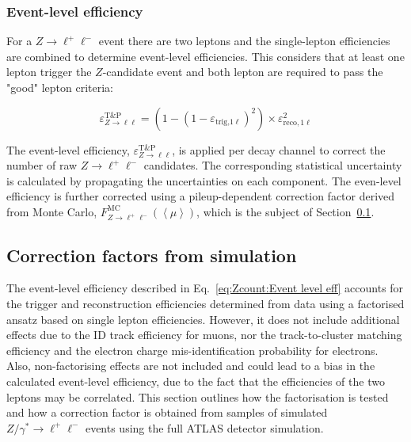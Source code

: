 \subsubsection{Event-level efficiency}

For a $Z\rightarrow\ell^+\ell^-$ event there are two leptons and the single-lepton efficiencies are combined to determine event-level efficiencies. This considers that at least one lepton trigger the $Z$-candidate event and both lepton are required to pass the "good" lepton criteria:

\begin{equation}
	\varepsilon^\text{T\&P}_{Z\rightarrow \ell\ell}=\left( 1 - (1-\varepsilon_{\text{trig,}1\ell})^2 \right)\times\varepsilon^2_{\text{reco},1\ell}
	\label{eq:Zcount:Event level eff}
\end{equation}

The event-level efficiency, $\varepsilon^\text{T\&P}_{Z\rightarrow \ell\ell}$, is applied per decay channel to correct the number of raw $Z\rightarrow\ell^+\ell^-$ candidates. The corresponding statistical uncertainty is calculated by propagating the uncertainties on each component. The even-level efficiency is further corrected using a pileup-dependent correction factor derived from Monte Carlo, $F^\text{MC}_{Z\rightarrow \ell^+\ell^-}(\left< \mu \right>)$, which is the subject of Section~\ref{sec:Zcount:MC correction factor}.

\subsection{Correction factors from simulation}
\label{sec:Zcount:MC correction factor}

The event-level efficiency described in Eq.~\ref{eq:Zcount:Event level eff} accounts for the trigger and reconstruction efficiencies determined from data using a factorised ansatz based on single lepton efficiencies. However, it does not include additional effects due to the ID track efficiency for muons, nor the track-to-cluster matching efficiency and the electron charge mis-identification probability for electrons. Also, non-factorising effects are not included and could lead to a bias in the calculated event-level efficiency, due to the fact that the efficiencies of the two leptons may be correlated. This section outlines how the factorisation is tested and how a correction factor is obtained from samples of simulated $Z/\gamma^*\rightarrow\ell^+\ell^-$ events using the full ATLAS detector simulation.

